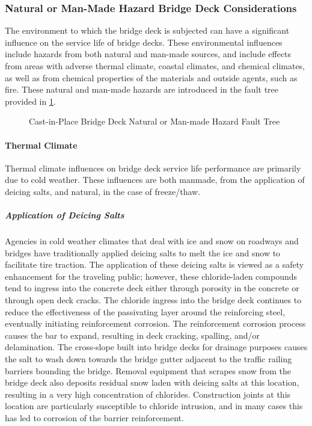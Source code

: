 \subsubsection{Natural or Man-Made Hazard Bridge Deck Considerations}
The environment to which the bridge deck is subjected can have a significant influence on the service life of bridge decks. These environmental influences include hazards from both natural and man-made sources, and include effects from areas with adverse thermal climate, coastal climates, and chemical climates, as well as from chemical properties of the materials and outside agents, such as fire. These natural and man-made hazards are introduced in the fault tree provided in \cref{fig:fault-tree-cip-deck-hazard}.

\begin{figure}
  \caption{Cast-in-Place Bridge Deck Natural or Man-made Hazard Fault Tree}
  \label{fig:fault-tree-cip-deck-hazard}
\end{figure}

\paragraph{Thermal Climate}
Thermal climate influences on bridge deck service life performance are primarily due to cold weather. These influences are both manmade, from the application of deicing salts, and natural, in the case of freeze/thaw.

\subparagraph*{Application of Deicing Salts}
Agencies in cold weather climates that deal with ice and snow on roadways and bridges have traditionally applied deicing salts to melt the ice and snow to facilitate tire traction. The application of these deicing salts is viewed as a safety enhancement for the traveling public; however, these chloride-laden compounds tend to ingress into the concrete deck either through porosity in the concrete or through open deck cracks. The chloride ingress into the bridge deck continues to reduce the effectiveness of the passivating layer around the reinforcing steel, eventually initiating reinforcement corrosion. The reinforcement corrosion process causes the bar to expand, resulting in deck cracking, spalling, and/or delamination. The cross-slope built into bridge decks for drainage purposes causes the salt to wash down towards the bridge gutter adjacent to the traffic railing barriers bounding the bridge. Removal equipment that scrapes snow from the bridge deck also deposits residual snow laden with deicing salts at this location, resulting in a very high concentration of chlorides. Construction joints at this location are particularly susceptible to chloride intrusion, and in many cases this has led to corrosion of the barrier reinforcement.

